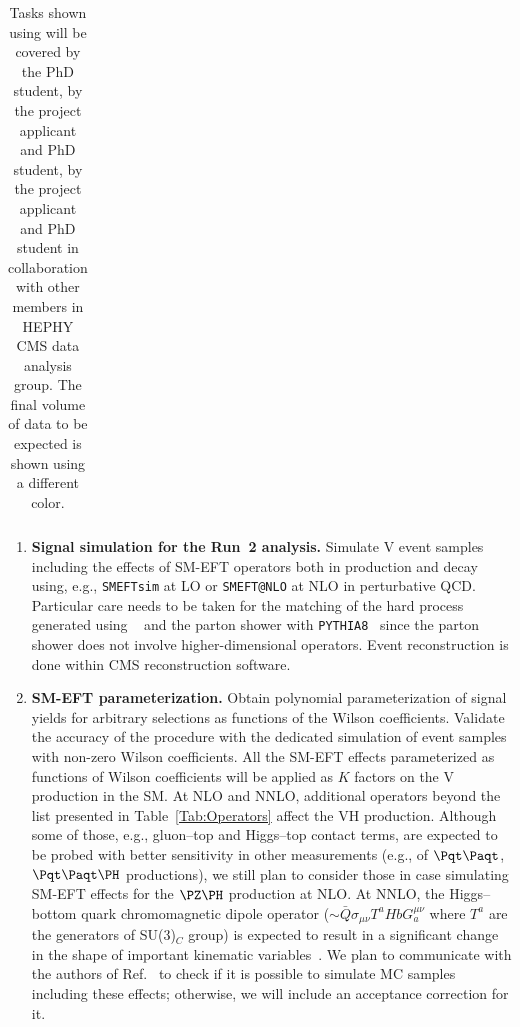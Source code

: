 \documentclass[a4paper,11pt]{article}
\newcommand{\Pt}{{{\Pqt}}\xspace}
\newcommand{\PAt}{{{{\Paqt}}}\xspace}
\def\strut{\relax\ifmmode\copy\strutbox\else\unhcopy\strutbox\fi}
\renewcommand{\PV}{{{{V}}}\xspace}
\newcommand{\VH}{{{\PV}{\PH}}\xspace}
\begin{document}
\begin{table}
\begin{tabular}{l|m{0.9cm}|m{1.5cm}|m{0.9cm}|m{0.9cm}|m{0.9cm}|m{0.9cm}|m{0.9cm}|m{0.9cm}|m{0.9cm}|m{0.9cm}|m{0.9cm}|m{0.9cm}|m{0.9cm}|m{0.9cm}|m{0.9cm}|}
    \hline
  \end{tabular}
  \caption{
Tasks shown using \colorbox{gray}{ \makebox[0.01\textwidth][20cm]{\strut}} will be covered by the PhD student, \colorbox{green}{ \makebox[0.01\textwidth][20cm]{\strut}} by the project applicant and PhD student, \colorbox{orange}{ \makebox[0.01\textwidth][20cm]{\strut}} by the project applicant and PhD student in collaboration with other members in HEPHY CMS data analysis group. 
The final volume of data to be expected  is shown using a different color. 
}
\label{tab:workplan}
\end{table}

\begin{enumerate}[noitemsep,topsep=0pt]
\item {\bf Signal simulation for the Run~2 analysis.} Simulate \VH event samples including the effects of SM-EFT operators both in production and decay using, e.g., \texttt{SMEFTsim} at LO or \texttt{SMEFT@NLO} at NLO in perturbative QCD. 
Particular care needs to be taken for the matching of the hard process generated using \texttt{\MGvATNLO}~\cite{Alwall:2014hca} and the parton shower with \texttt{PYTHIA8}~\cite{Sjostrand:2014zea} 
since the parton shower does not involve higher-dimensional operators. Event reconstruction is done within CMS reconstruction software.

\item {\bf SM-EFT parameterization.} Obtain polynomial parameterization of signal yields for arbitrary selections as functions of the Wilson coefficients. Validate the accuracy of the procedure with the dedicated simulation of event samples with non-zero Wilson coefficients.
All the SM-EFT effects parameterized as functions of Wilson coefficients will be applied as $K$ factors on the \VH production in the SM. 
At NLO and NNLO, additional operators beyond the list presented in Table~\ref{Tab:Operators} affect the VH production. Although some of those, e.g., gluon--top and Higgs--top contact terms, are expected to be probed with better sensitivity in other measurements (e.g., of $\Pt\PAt$, $\Pt\PAt\PH$ productions), we still plan to consider those in case simulating SM-EFT effects for the $\PZ\PH$ production at NLO. 
At NNLO, the Higgs--bottom quark chromomagnetic dipole operator ($\sim \bar{Q} {\sigma}_{\mu\nu} T^a H b G^{\mu\nu}_{a}$ where $T^a$ are the generators of SU(3)$_C$ group) is expected to result in a significant change in the shape of important kinematic variables~\cite{Haisch:2022nwz}. We plan to communicate with the authors of Ref.~\cite{Haisch:2022nwz} to check if it is possible to simulate MC samples including these effects; otherwise, we will include an acceptance correction for it.


\end{enumerate}
\end{document}
